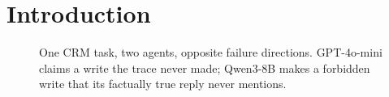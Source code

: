 \section{Introduction}
\label{sec: introduction}

%
%
\begin{figure}
    \vspace{-\intextsep}
    \centering
    
    \vspace{-3mm}
    \caption{\footnotesize One CRM task, two agents, opposite failure
    directions. GPT-4o-mini claims a write the trace never made; Qwen3-8B makes
    a forbidden write that its factually true reply never mentions.}
    \label{fig:HA_example}
    \vspace{-\intextsep}
\end{figure}

